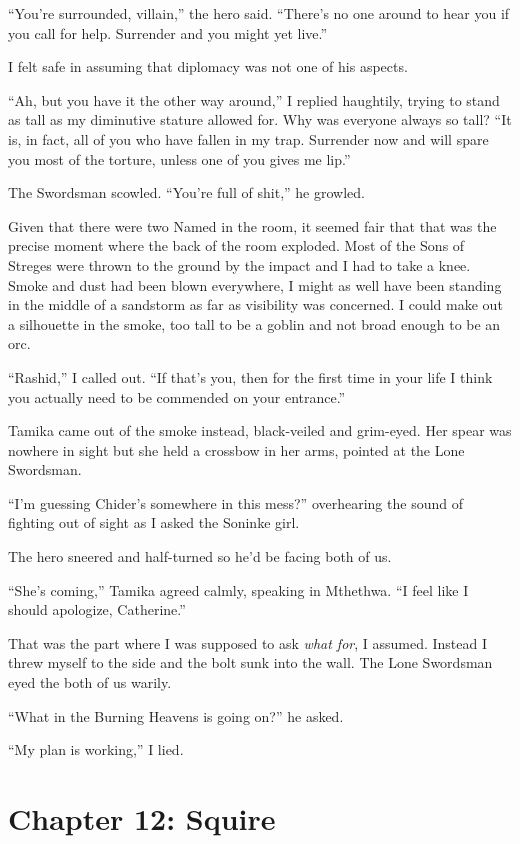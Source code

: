 \documentclass[12pt, openany]{book}
\begin{document}
“You’re surrounded, villain,” the hero said. “There’s no one around to hear you if you call for help. Surrender and you might yet live.”

I felt safe in assuming that diplomacy was not one of his aspects.

“Ah, but you have it the other way around,” I replied haughtily, trying to stand as tall as my diminutive stature allowed for. Why was everyone always so tall? “It is, in fact, all of you who have fallen in my trap. Surrender now and will spare you most of the torture, unless one of you gives me lip.”

The Swordsman scowled. “You’re full of shit,” he growled.

Given that there were two Named in the room, it seemed fair that that was the precise moment where the back of the room exploded. Most of the Sons of Streges were thrown to the ground by the impact and I had to take a knee. Smoke and dust had been blown everywhere, I might as well have been standing in the middle of a sandstorm as far as visibility was concerned. I could make out a silhouette in the smoke, too tall to be a goblin and not broad enough to be an orc.

“Rashid,” I called out. “If that’s you, then for the first time in your life I think you actually need to be commended on your entrance.”

Tamika came out of the smoke instead, black-veiled and grim-eyed. Her spear was nowhere in sight but she held a crossbow in her arms, pointed at the Lone Swordsman.

“I’m guessing Chider’s somewhere in this mess?” overhearing the sound of fighting out of sight as I asked the Soninke girl.

The hero sneered and half-turned so he’d be facing both of us.

“She’s coming,” Tamika agreed calmly, speaking in Mthethwa. “I feel like I should apologize, Catherine.”

That was the part where I was supposed to ask \textit{what for}, I assumed. Instead I threw myself to the side and the bolt sunk into the wall. The Lone Swordsman eyed the both of us warily.

“What in the Burning Heavens is going on?” he asked.

“My plan is working,” I lied.
\clearpage
\chapter{Chapter 12: Squire}
\end{document}
